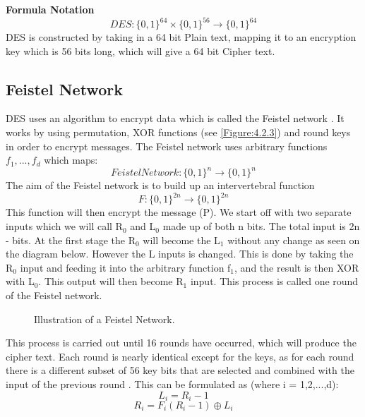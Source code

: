 \documentclass[11pt,a4paper]{report}
\begin{document}
\textbf{Formula Notation}
\begin{displaymath}
DES: \{0,1\}^{64} \times \{0,1\}^{56} \rightarrow \{0,1\}^{64}
\end{displaymath}
DES is constructed by taking in a 64 bit Plain text, mapping it to an encryption key which is 56 bits long, which will give a 64 bit Cipher text.

\subsection{Feistel Network}
DES uses an algorithm to encrypt data which is called the Feistel network \cite{DBLP:books/sp/Buchmann02}. It works by using permutation, XOR functions (see \ref{Figure:4.2.3}) and round keys in order to encrypt messages. The Feistel network uses arbitrary functions $f_{1},...,f_{d}$ which maps:
\begin{displaymath}
FeistelNetwork: \{0,1\}^n \rightarrow \{0,1\}^n
\end{displaymath}
The aim of the Feistel network is to build up an intervertebral function
\begin{displaymath}
F: \{0,1\}^{2n} \rightarrow \{0,1\}^{2n}
\end{displaymath}
This function will then encrypt the message (P). We start off with two separate inputs which we will call R$_{0}$ and L$_{0}$ made up of both n bits. The total input is 2n - bits. At the first stage the R$_{0}$ will become the L$_{1}$ without any change as seen on the diagram below. However the L inputs is changed. This is done by taking the R$_{0}$ input and feeding it into the arbitrary function f$_{1}$, and the result is then XOR with L$_{0}$. This output will then become R$_{1}$ input. This process is called one round of the Feistel network.
\begin{figure}[h]
\centering
\label{Fig: Feistel Network}
\caption{Illustration of a Feistel Network.}
\end{figure}

This process is carried out until 16 rounds have occurred, which will produce the cipher text. Each round is nearly identical except for the keys, as for each round there is a different subset of 56
key bits that are selected and combined with the input of the previous round \cite{Fabio2000LogicalSAT}.
This can be formulated as (where i = 1,2,...,d):
\begin{displaymath}
L_{i} = R_{i}-1
\end{displaymath}
\begin{displaymath}
R_{i} = F_{i} (R_{i}-1) \oplus L_{i}
\end{displaymath}
\end{document}
